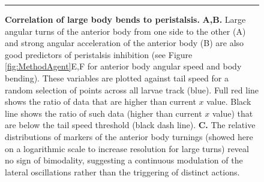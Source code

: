 



\begin{figure}
\begin{center}
\caption{{\bf Correlation of large body bends to peristalsis.}
 {\bf A,B.} Large angular turns of the anterior body from one side to the other (A) and strong angular acceleration of the anterior body (B) are also good predictors of peristalsis inhibition (see Figure \ref{fig:MethodAgent}E,F for anterior body angular speed and body bending). These variables are plotted against tail speed for a random selection of points across all larvae track (blue). Full red line shows the ratio of data that are higher than current $x$ value. Black line shows the ratio of such data (higher than current $x$ value) that are below the tail speed threshold (black dash line).
 {\bf C.} The relative distributions of markers of the anterior body turnings (showed here on a logarithmic scale to increase resolution for large turns) reveal no sign of bimodality, suggesting a continuous modulation of the lateral oscillations rather than the triggering of distinct actions.
\label{fig:FigS2}}
\end{center}
\hrule
\end{figure}


